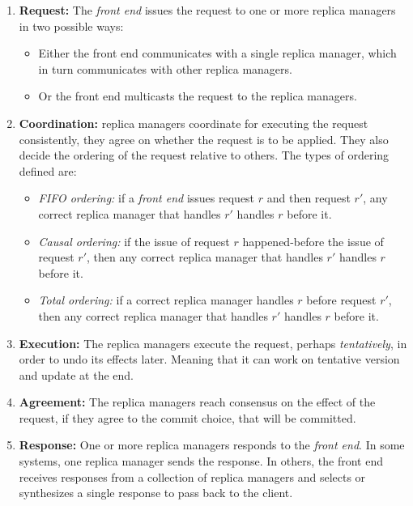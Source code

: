 \begin{enumerate}
	\item \textbf{Request:} The \textit{front end} issues the request to one or more replica managers in two possible ways:
	\begin{itemize}
		\item Either the front end communicates with a single replica manager, which in turn communicates with other replica managers.
		\item Or the front end multicasts the request to the replica managers.
	\end{itemize}
	\item \textbf{Coordination:} replica managers coordinate for executing the
	request consistently, they agree on whether the request is to be applied. They also decide the ordering of the request relative to others. The types of ordering defined are:
	\begin{itemize}
		\item \textit{FIFO ordering:} if a \textit{front end} issues request $r$ and then request $r'$, any correct replica manager that handles $r'$ handles $r$ before it.
		\item \textit{Causal ordering:} if the issue of request $r$ happened-before the issue of request $r'$, then any correct replica manager that handles $r'$ handles $r$ before it.
		\item \textit{Total ordering:} if a correct replica manager handles $r$ before request $r'$, then any correct replica manager that handles $r'$ handles $r$ before it.
	\end{itemize}
	\item \textbf{Execution:} The replica managers execute the request, perhaps \textit{tentatively}, in order to undo its effects later. Meaning that it can work on tentative version and update at the end.
	
	\item \textbf{Agreement:} The replica managers reach consensus on the effect of the request, if they agree to the commit choice, that will be committed.
	\item \textbf{Response:} One or more replica managers responds to the \textit{front end}. In some systems, one replica manager sends the response. In others, the front end receives responses from a collection of replica managers and selects or synthesizes a single response to pass back to the client.
\end{enumerate}
\newpage

